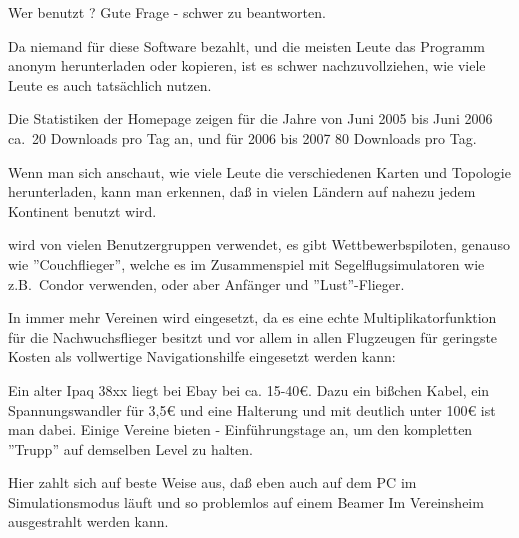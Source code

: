 Wer benutzt \xc? Gute Frage - schwer zu beantworten. 

Da niemand für diese Software bezahlt, und die meisten Leute das Programm 
anonym herunterladen oder kopieren, ist es schwer nachzuvollziehen,  wie viele Leute es auch tatsächlich nutzen.

Die Statistiken der Homepage zeigen für die Jahre von Juni 2005 bis Juni 2006 ca.\ 20 Downloads pro Tag an, und für 2006 bis 2007 80 Downloads pro Tag.

Wenn man sich anschaut, wie viele Leute die verschiedenen Karten und Topologie  herunterladen, kann man erkennen, daß \xc in vielen Ländern auf nahezu jedem Kontinent benutzt wird.

\xc wird von vielen Benutzergruppen verwendet, es gibt Wettbewerbspiloten, genauso wie ''Couchflieger'',
welche es im Zusammenspiel mit Segelflugsimulatoren wie z.B.\ Condor verwenden, oder aber Anfänger und ''Lust''-Flieger.

In immer mehr Vereinen wird \xc eingesetzt, da es eine echte Multiplikatorfunktion für die Nachwuchsflieger besitzt  und vor allem
in allen Flugzeugen für geringste Kosten als vollwertige Navigationshilfe eingesetzt werden kann:


Ein alter Ipaq 38xx liegt bei Ebay bei ca. 15-40\euro{}. Dazu ein bißchen Kabel, ein Spannungswandler für 3,5\euro{} und eine Halterung 
und mit deutlich unter 100\euro{} ist man dabei.  
Einige Vereine bieten \xc - Einführungstage an, um den kompletten ''Trupp'' auf demselben Level zu halten.

Hier zahlt sich auf beste Weise aus, daß \xc eben auch auf dem PC im Simulationsmodus läuft und so problemlos auf einem Beamer Im Vereinsheim 
ausgestrahlt werden kann.


